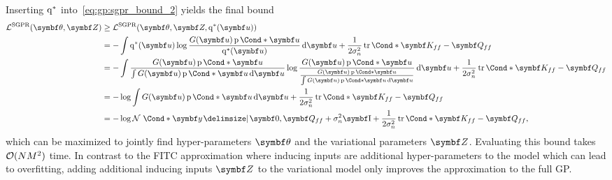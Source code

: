 Inserting $\operatorname{q}^\ast$ into~\cref{eq:gp:sgpr_bound_2} yields the final bound
\begin{align}
    \begin{split}
        \label{eq:gp:sgpr_bound}
        \Lc^{\text{SGPR}}(\mat{\theta}, \mat{Z})
        &\geq \Lc^{\text{SGPR}}(\mat{\theta}, \mat{Z}, \q^\ast(\mat{u})) \\
        &= -\int \q^\ast(\mat{u}) \log\frac{G(\mat{u})\Prob*{\mat{u}}}{\q^\ast(\mat{u})} \diff \mat{u} + \frac{1}{2\sigma_n^2}\Fun*{\tr}{\mat{K_{ff}} - \mat{Q_{ff}}} \\
        &= -\int \frac{G(\mat{u}) \Prob*{\mat{u}}}{\int G(\mat{u}) \Prob*{\mat{u}} \diff \mat{u}} \log\frac{G(\mat{u})\Prob*{\mat{u}}}{\frac{G(\mat{u}) \Prob*{\mat{u}}}{\int G(\mat{u}) \Prob*{\mat{u}} \diff \mat{u}}} \diff \mat{u} + \frac{1}{2\sigma_n^2}\Fun*{\tr}{\mat{K_{ff}} - \mat{Q_{ff}}} \\
        &= -\log \int G(\mat{u}) \Prob*{\mat{u}} \diff \mat{u} + \frac{1}{2\sigma_n^2}\Fun*{\tr}{\mat{K_{ff}} - \mat{Q_{ff}}} \\
        &= -\log \Gaussian*{\mat{y} \given \mat{0}, \mat{Q_{ff}} + \sigma_n^2\Eye} + \frac{1}{2\sigma_n^2}\Fun*{\tr}{\mat{K_{ff}} - \mat{Q_{ff}}},
    \end{split}
\end{align}
which can be maximized to jointly find hyper-parameters $\mat{\theta}$ and the variational parameters $\mat{Z}$.
Evaluating this bound takes $\operatorname{\mathcal{O}}(NM^2)$ time.
In contrast to the FITC approximation where inducing inputs are additional hyper-parameters to the model which can lead to overfitting, adding additional inducing inputs $\mat{Z}$ to the variational model only improves the approximation to the full GP.

